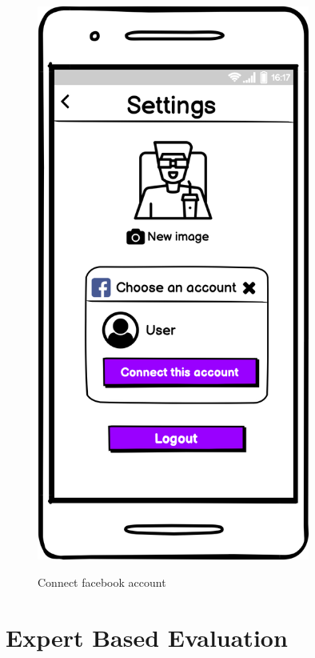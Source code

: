 \documentclass[12pt, a4paper]{article}
\numberwithin{figure}{section}
\begin{document}
\begin{center}
\begin{minipage}{0.3\textwidth}
\begin{figure}[H]
			\includegraphics[width=0.8\textwidth]{images/mockups/User setting facebook.png}\\
			\caption{Connect facebook account}
		\end{figure}
	\end{minipage}
\end{center}


\newpage

\section{Expert Based Evaluation}
\end{document}
